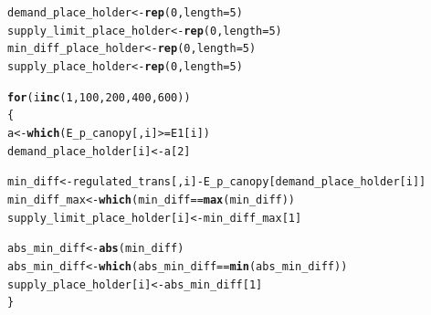 \documentclass[a4paper]{article}\usepackage[]{graphicx}\usepackage[]{color}
\makeatletter
\newcommand{\hlnum}[1]{\textcolor[rgb]{0.686,0.059,0.569}{#1}}%
\newcommand{\hlopt}[1]{\textcolor[rgb]{0,0,0}{#1}}%
\newcommand{\hlstd}[1]{\textcolor[rgb]{0.345,0.345,0.345}{#1}}%
\newcommand{\hlkwa}[1]{\textcolor[rgb]{0.161,0.373,0.58}{\textbf{#1}}}%
\newcommand{\hlkwb}[1]{\textcolor[rgb]{0.69,0.353,0.396}{#1}}%
\newcommand{\hlkwc}[1]{\textcolor[rgb]{0.333,0.667,0.333}{#1}}%
\newcommand{\hlkwd}[1]{\textcolor[rgb]{0.737,0.353,0.396}{\textbf{#1}}}%
\newenvironment{kframe}{%
 \def\at@end@of@kframe{}%
 \ifinner\ifhmode%
  \def\at@end@of@kframe{\end{minipage}}%
  \begin{minipage}{\columnwidth}%
 \fi\fi%
 \def\FrameCommand##1{\hskip\@totalleftmargin \hskip-\fboxsep
 \colorbox{shadecolor}{##1}\hskip-\fboxsep
     \hskip-\linewidth \hskip-\@totalleftmargin \hskip\columnwidth}%
 \MakeFramed {\advance\hsize-\width
   \@totalleftmargin\z@ \linewidth\hsize
   \@setminipage}}%
 {\par\unskip\endMakeFramed%
 \at@end@of@kframe}
\newenvironment{knitrout}{}{} %
\makeatother
\begin{document}
\begin{knitrout}
\color{fgcolor}\begin{kframe}
\begin{alltt}
\hlstd{demand_place_holder} \hlkwb{<-} \hlkwd{rep}\hlstd{(}\hlnum{0}\hlstd{,} \hlkwc{length}\hlstd{=}\hlnum{5}\hlstd{)}
\hlstd{supply_limit_place_holder} \hlkwb{<-} \hlkwd{rep}\hlstd{(}\hlnum{0}\hlstd{,} \hlkwc{length}\hlstd{=}\hlnum{5}\hlstd{)}
\hlstd{min_diff_place_holder} \hlkwb{<-} \hlkwd{rep}\hlstd{(}\hlnum{0}\hlstd{,} \hlkwc{length}\hlstd{=}\hlnum{5}\hlstd{)}
\hlstd{supply_place_holder} \hlkwb{<-} \hlkwd{rep}\hlstd{(}\hlnum{0}\hlstd{,} \hlkwc{length}\hlstd{=}\hlnum{5}\hlstd{)}

\hlkwa{for}\hlstd{(i} \hlkwa{in} \hlkwd{c}\hlstd{(}\hlnum{1}\hlstd{,}\hlnum{100}\hlstd{,}\hlnum{200}\hlstd{,}\hlnum{400}\hlstd{,}\hlnum{600}\hlstd{))}
\hlstd{\{}
    \hlstd{a} \hlkwb{<-}\hlkwd{which}\hlstd{(E_p_canopy[,i]} \hlopt{>=} \hlstd{E1[i])}
    \hlstd{demand_place_holder[i]} \hlkwb{<-}\hlstd{a[}\hlnum{2}\hlstd{]}

    \hlstd{min_diff} \hlkwb{<-} \hlstd{regulated_trans[,i]} \hlopt{-} \hlstd{E_p_canopy[demand_place_holder[i]]}
    \hlstd{min_diff_max} \hlkwb{<-} \hlkwd{which}\hlstd{(min_diff} \hlopt{==} \hlkwd{max}\hlstd{(min_diff))}
    \hlstd{supply_limit_place_holder[i]} \hlkwb{<-} \hlstd{min_diff_max[}\hlnum{1}\hlstd{]}

    \hlstd{abs_min_diff} \hlkwb{<-} \hlkwd{abs}\hlstd{(min_diff)}
    \hlstd{abs_min_diff} \hlkwb{<-} \hlkwd{which}\hlstd{(abs_min_diff} \hlopt{==} \hlkwd{min}\hlstd{(abs_min_diff))}
    \hlstd{supply_place_holder[i]} \hlkwb{<-} \hlstd{abs_min_diff[}\hlnum{1}\hlstd{]}
\hlstd{\}}
\end{alltt}
\end{kframe}
\end{knitrout}
\end{document}
